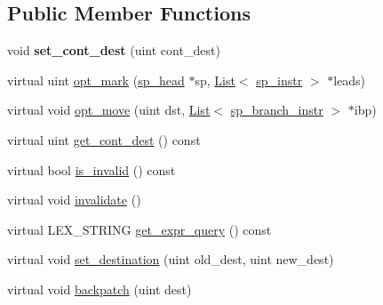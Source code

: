 \subsection*{Public Member Functions}
\begin{DoxyCompactItemize}
\item 
\mbox{\label{classsp__lex__branch__instr_afd0024a01681dd4cb0a8b86cfcbdedb5}} 
void {\bfseries set\+\_\+cont\+\_\+dest} (uint cont\+\_\+dest)
\item 
virtual uint \mbox{\hyperlink{classsp__lex__branch__instr_a07500581e51283aad3b04602a7b87c74}{opt\+\_\+mark}} (\mbox{\hyperlink{classsp__head}{sp\+\_\+head}} $\ast$sp, \mbox{\hyperlink{classList}{List}}$<$ \mbox{\hyperlink{classsp__instr}{sp\+\_\+instr}} $>$ $\ast$leads)
\item 
virtual void \mbox{\hyperlink{classsp__lex__branch__instr_ae7d74a74399102d85e481c4e46751cfe}{opt\+\_\+move}} (uint dst, \mbox{\hyperlink{classList}{List}}$<$ \mbox{\hyperlink{classsp__branch__instr}{sp\+\_\+branch\+\_\+instr}} $>$ $\ast$ibp)
\item 
virtual uint \mbox{\hyperlink{classsp__lex__branch__instr_a5e6dfdf34d9f45fb3f2d2386029b95c6}{get\+\_\+cont\+\_\+dest}} () const
\item 
virtual bool \mbox{\hyperlink{classsp__lex__branch__instr_a22c35f1cd8a840a61e4881903ad6ff03}{is\+\_\+invalid}} () const
\item 
virtual void \mbox{\hyperlink{classsp__lex__branch__instr_a91d747da2e1068e2d6ac0fd7c06a4018}{invalidate}} ()
\item 
virtual L\+E\+X\+\_\+\+S\+T\+R\+I\+NG \mbox{\hyperlink{classsp__lex__branch__instr_a3693c3f9cc8fdf15092dcb3d4183075b}{get\+\_\+expr\+\_\+query}} () const
\item 
virtual void \mbox{\hyperlink{classsp__lex__branch__instr_ae3ef8f864474467824615e33f0663d76}{set\+\_\+destination}} (uint old\+\_\+dest, uint new\+\_\+dest)
\item 
virtual void \mbox{\hyperlink{classsp__lex__branch__instr_a0a28016e4c51d49eb9ff014b0afa7703}{backpatch}} (uint dest)
\end{DoxyCompactItemize}
